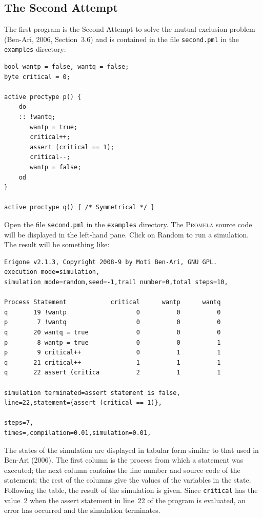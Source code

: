 \documentclass[11pt]{article}
\newcommand*{\prm}{\textsc{Promela}}
\newcommand*{\p}[1]{\texttt{#1}}
\newcommand*{\bu}[1]{\textsf{#1}}
\begin{document}
\subsection*{The Second Attempt}

The first program is the Second Attempt to solve the mutual
exclusion problem (Ben-Ari, 2006, Section~3.6) and is contained in
the file \p{second.pml} in the \p{examples} directory:

\begin{verbatim}
bool wantp = false, wantq = false;
byte critical = 0; 

active proctype p() {
    do 
    :: !wantq;
       wantp = true;
       critical++;
       assert (critical == 1);
       critical--;
       wantp = false;
    od
}

active proctype q() { /* Symmetrical */ }
\end{verbatim}

Open the file \p{second.pml} in the \p{examples} directory. The \prm{}
source code will be displayed in the left-hand pane. Click on
\bu{Random} to run a simulation. The result will be something like:

\pagebreak[4]

\begin{verbatim}
Erigone v2.1.3, Copyright 2008-9 by Moti Ben-Ari, GNU GPL.
execution mode=simulation,
simulation mode=random,seed=-1,trail number=0,total steps=10,

Process Statement            critical      wantp      wantq 
q       19 !wantp                   0          0          0 
p        7 !wantq                   0          0          0 
q       20 wantq = true             0          0          0 
p        8 wantp = true             0          0          1 
p        9 critical++               0          1          1 
q       21 critical++               1          1          1 
q       22 assert (critica          2          1          1 

simulation terminated=assert statement is false,
line=22,statement={assert (critical == 1)},

steps=7,
times=,compilation=0.01,simulation=0.01,
\end{verbatim}

The states of the simulation are displayed in tabular form similar to
that used in Ben-Ari (2006). The first column is the process from which
a statement was executed; the next column contains the line number and
source code of the statement; the rest of the columns give the values of
the variables in the state. Following the table, the result of the
simulation is given. Since \p{critical} has the value~2 when the assert
statement in line~22 of the program is evaluated, an error has occurred
and the simulation terminates.
\end{document}
